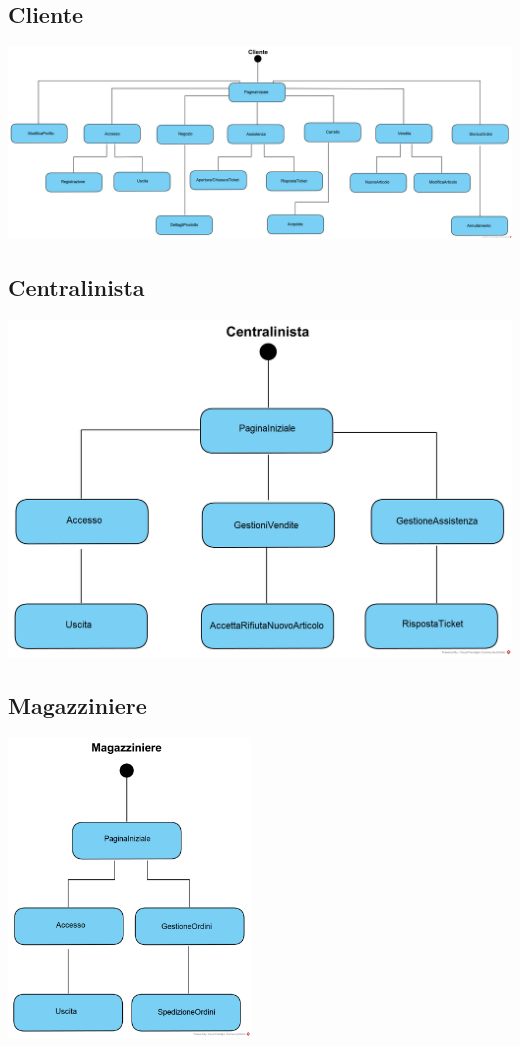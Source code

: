 \documentclass[12pt,a4paper]{article}
\begin{document}
\subsection{Cliente}
\begin{center}
\includegraphics[width=\textwidth]{NavigationalPath/Cliente}
\end{center}

\subsection{Centralinista}
\begin{center}
\includegraphics[width=\textwidth]{NavigationalPath/Centralinista}
\end{center}

\subsection{Magazziniere}
\begin{center}
\includegraphics[height=300px]{NavigationalPath/Magazziniere}
\end{center}
\end{document}
